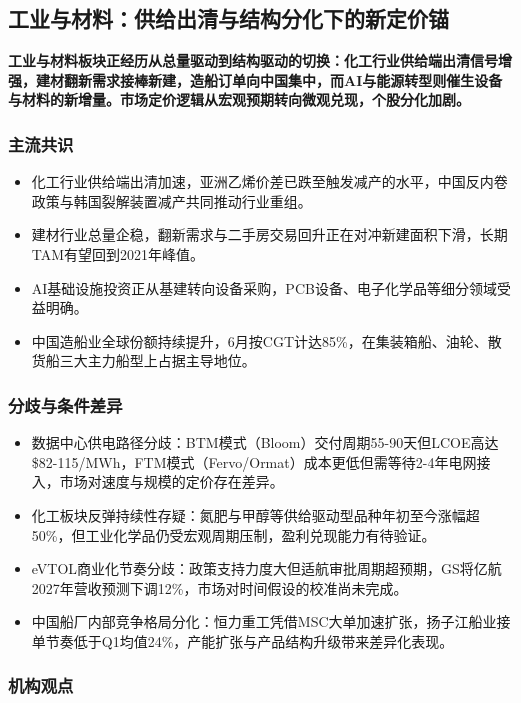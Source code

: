 \documentclass[11pt]{ctexart}
\begin{document}
\subsection{工业与材料：供给出清与结构分化下的新定价锚}
\textbf{工业与材料板块正经历从总量驱动到结构驱动的切换：化工行业供给端出清信号增强，建材翻新需求接棒新建，造船订单向中国集中，而AI与能源转型则催生设备与材料的新增量。市场定价逻辑从宏观预期转向微观兑现，个股分化加剧。}
\subsubsection*{主流共识}
\begin{itemize}
  \item 化工行业供给端出清加速，亚洲乙烯价差已跌至触发减产的水平，中国反内卷政策与韩国裂解装置减产共同推动行业重组。
  \item 建材行业总量企稳，翻新需求与二手房交易回升正在对冲新建面积下滑，长期TAM有望回到2021年峰值。
  \item AI基础设施投资正从基建转向设备采购，PCB设备、电子化学品等细分领域受益明确。
  \item 中国造船业全球份额持续提升，6月按CGT计达85\%，在集装箱船、油轮、散货船三大主力船型上占据主导地位。
\end{itemize}
\subsubsection*{分歧与条件差异}
\begin{itemize}
  \item 数据中心供电路径分歧：BTM模式（Bloom）交付周期55-90天但LCOE高达\$82-115/MWh，FTM模式（Fervo/Ormat）成本更低但需等待2-4年电网接入，市场对速度与规模的定价存在差异。
  \item 化工板块反弹持续性存疑：氮肥与甲醇等供给驱动型品种年初至今涨幅超50\%，但工业化学品仍受宏观周期压制，盈利兑现能力有待验证。
  \item eVTOL商业化节奏分歧：政策支持力度大但适航审批周期超预期，GS将亿航2027年营收预测下调12\%，市场对时间假设的校准尚未完成。
  \item 中国船厂内部竞争格局分化：恒力重工凭借MSC大单加速扩张，扬子江船业接单节奏低于Q1均值24\%，产能扩张与产品结构升级带来差异化表现。
\end{itemize}
\subsubsection*{机构观点}
\end{document}

